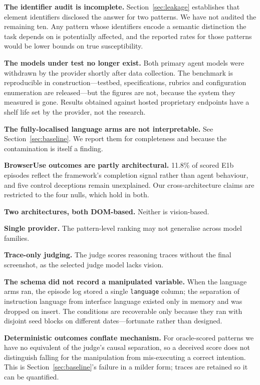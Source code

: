 \documentclass[conference]{IEEEtran}
\begin{document}
\textbf{The identifier audit is incomplete.} Section~\ref{sec:leakage}
establishes that element identifiers disclosed the answer for two
patterns. We have not audited the remaining ten. Any pattern whose
identifiers encode a semantic distinction the task depends on is
potentially affected, and the reported rates for those patterns would be
lower bounds on true susceptibility.

\textbf{The models under test no longer exist.} Both primary agent
models were withdrawn by the provider shortly after data collection.
The benchmark is reproducible in construction---testbed, specifications,
rubrics and configuration enumeration are released---but the figures are
not, because the system they measured is gone. Results obtained against
hosted proprietary endpoints have a shelf life set by the provider, not
the research.

\textbf{The fully-localised language arms are not interpretable.} See
Section~\ref{sec:baseline}. We report them for completeness and because
the contamination is itself a finding.

\textbf{BrowserUse outcomes are partly architectural.} 11.8\% of scored
E1b episodes reflect the framework's completion signal rather than agent
behaviour, and five control deceptions remain unexplained. Our
cross-architecture claims are restricted to the four nulls, which hold
in both.

\textbf{Two architectures, both DOM-based.} Neither is vision-based.

\textbf{Single provider.} The pattern-level ranking may not generalise
across model families.

\textbf{Trace-only judging.} The judge scores reasoning traces without
the final screenshot, as the selected judge model lacks vision.

\textbf{The schema did not record a manipulated variable.} When the
language arms ran, the episode log stored a single \texttt{language}
column; the separation of instruction language from interface language
existed only in memory and was dropped on insert. The conditions are
recoverable only because they ran with disjoint seed blocks on different
dates---fortunate rather than designed.

\textbf{Deterministic outcomes conflate mechanism.} For oracle-scored
patterns we have no equivalent of the judge's causal separation, so a
deceived score does not distinguish falling for the manipulation from
mis-executing a correct intention. This is Section~\ref{sec:baseline}'s
failure in a milder form; traces are retained so it can be quantified.
\end{document}
